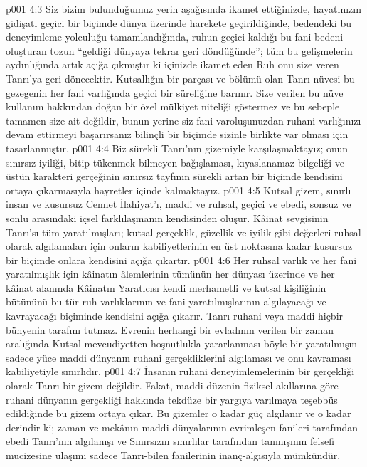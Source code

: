 \vs p001 4:3 Siz bizim bulunduğumuz yerin aşağısında ikamet ettiğinizde, hayatınızın gidişatı geçici bir biçimde dünya üzerinde harekete geçirildiğinde, bedendeki bu deneyimleme yolculuğu tamamlandığında, ruhun geçici kaldığı bu fani bedeni oluşturan tozun “geldiği dünyaya tekrar geri döndüğünde”; tüm bu gelişmelerin aydınlığında artık açığa çıkmıştır ki içinizde ikamet eden Ruh onu size veren Tanrı’ya geri dönecektir. Kutsallığın bir parçası ve bölümü olan Tanrı nüvesi bu gezegenin her fani varlığında geçici bir süreliğine barınır. Size verilen bu nüve kullanım hakkından doğan bir özel mülkiyet niteliği göstermez ve bu sebeple tamamen size ait değildir, bunun yerine siz fani varoluşunuzdan ruhani varlığınızı devam ettirmeyi başarırsanız bilinçli bir biçimde sizinle birlikte var olması için tasarlanmıştır.
\vs p001 4:4 Biz sürekli Tanrı’nın gizemiyle karşılaşmaktayız; onun sınırsız iyiliği, bitip tükenmek bilmeyen bağışlaması, kıyaslanamaz bilgeliği ve üstün karakteri gerçeğinin sınırsız tayfının sürekli artan bir biçimde kendisini ortaya çıkarmasıyla hayretler içinde kalmaktayız.
\vs p001 4:5 Kutsal gizem, sınırlı insan ve kusursuz Cennet İlahiyat’ı, maddi ve ruhsal, geçici ve ebedi, sonsuz ve sonlu arasındaki içsel farklılaşmanın kendisinden oluşur. Kâinat sevgisinin Tanrı’sı tüm yaratılmışları; kutsal gerçeklik, güzellik ve iyilik gibi değerleri ruhsal olarak algılamaları için onların kabiliyetlerinin en üst noktasına kadar kusursuz bir biçimde onlara kendisini açığa çıkartır.
\vs p001 4:6 Her ruhsal varlık ve her fani yaratılmışlık için kâinatın âlemlerinin tümünün her dünyası üzerinde ve her kâinat alanında Kâinatın Yaratıcısı kendi merhametli ve kutsal kişiliğinin bütününü bu tür ruh varlıklarının ve fani yaratılmışlarının algılayacağı ve kavrayacağı biçiminde kendisini açığa çıkarır. Tanrı ruhani veya maddi hiçbir bünyenin tarafını tutmaz. Evrenin herhangi bir evladının verilen bir zaman aralığında Kutsal mevcudiyetten hoşnutlukla yararlanması böyle bir yaratılmışın sadece yüce maddi dünyanın ruhani gerçekliklerini algılaması ve onu kavraması kabiliyetiyle sınırlıdır.
\vs p001 4:7 İnsanın ruhani deneyimlemelerinin bir gerçekliği olarak Tanrı bir gizem değildir. Fakat, maddi düzenin fiziksel akıllarına göre ruhani dünyanın gerçekliği hakkında tekdüze bir yargıya varılmaya teşebbüs edildiğinde bu gizem ortaya çıkar. Bu gizemler o kadar güç algılanır ve o kadar derindir ki; zaman ve mekânın maddi dünyalarının evrimleşen fanileri tarafından ebedi Tanrı’nın algılanışı ve Sınırsızın sınırlılar tarafından tanınışının felsefi mucizesine ulaşımı sadece Tanrı\hyp{}bilen fanilerinin inanç\hyp{}algısıyla mümkündür.

